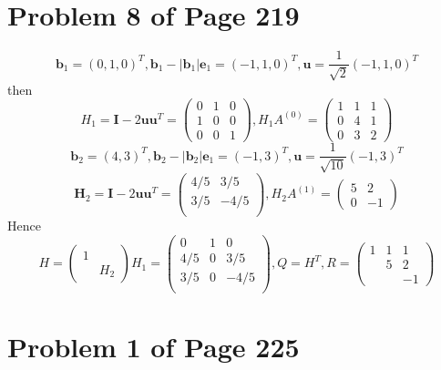 \documentclass[12pt,a4paper]{article}
\newcommand{\mysection}[2]{
\section{Problem #1 of Page #2}	
	}
\begin{document}
\mysection{8}{219}
\[
	\bm{b}_1 = (0,1,0)^T, \bm{b}_1 - |\bm{b}_1|\bm{e}_1 = (-1,1,0)^T,
	\bm{u} = \frac{1}{\sqrt{2}}(-1,1,0)^T
\]
then
\[
	H_1 = \bm{I} - 2\bm{uu}^T = \left(\begin{array}{ccc}
		 0& 1 &0 \\
		 1& 0 &0 \\
		 0& 0 & 1
	\end{array} \right),
	H_1 A^{(0)} = \left( \begin{array}{ccc}
		1 & 1 & 1 \\
		0 & 4 & 1\\
		0 & 3 & 2
	\end{array} \right) 
\]
\[
	\bm{b}_2 = (4,3)^T,  \bm{b}_2 - |\bm{b}_2|\bm{e}_1 = (-1,3)^T,
	\bm{u} = \frac{1}{\sqrt{10}}(-1,3  )^T
\]
\[
	\bm{H}_2 = \bm{I} - 2\bm{uu}^T= \left(\begin{array}{cc}
	4/5& 3/5 \\
	3/5& -4/5 \\
	\end{array} \right), 
	H_2A^{(1)} = \left( \begin{array}{cc}
		5 & 2 \\
		0 & -1
	\end{array} \right) 
\]
Hence
\[
	H = \left( \begin{array}{cc}
		1 & \\
		 & H_2 
	\end{array}\right) 	H_1 = \left(\begin{array}{ccc}
		0 & 1 & 0 \\
		4/5 & 0 & 3/5 \\
		3/5 & 0 &-4/5 \\
	\end{array}\right) ,
	Q = H^T, 
	R = \left( \begin{array}{ccc}
		1 & 1 & 1 \\
		& 5 & 2\\
		& & -1
	\end{array} \right) 
\]
\mysection{1}{225}
\end{document}
